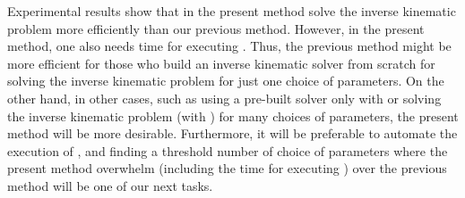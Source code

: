 \documentclass{birkjour}
\theoremstyle{plain}
\theoremstyle{definition}
\begin{document}
    Experimental results show that  in the present method solve the inverse 
    kinematic problem more efficiently than our previous method. 
    However, in the present method, one also needs time for executing .
    Thus, the previous method might be more efficient 
    for those who build an inverse kinematic solver from scratch for solving
    the inverse kinematic problem for just one choice of parameters.
    On the other hand, in other cases, such as using a pre-built solver 
    only with 
    or solving the inverse kinematic problem (with )
    for many choices of parameters, the present method 
    will be more desirable. Furthermore, it will be preferable to automate 
    the execution of , 
    and finding a threshold number of choice of parameters where the present method overwhelm 
    (including the time for executing ) over the previous method 
    will be one of our next tasks.
\end{document}
